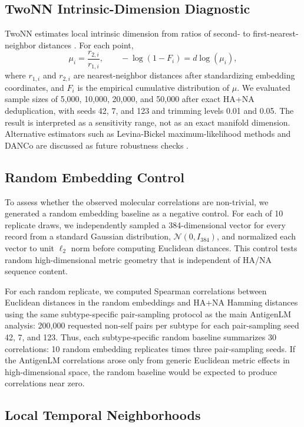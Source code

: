 \documentclass[11pt]{article}
\begin{document}
\subsection{TwoNN Intrinsic-Dimension Diagnostic}

TwoNN estimates local intrinsic dimension from ratios of second- to first-nearest-neighbor distances \cite{facco2017intrinsic}. For each point,
\[
\mu_i=\frac{r_{2,i}}{r_{1,i}},
\qquad
-\log(1-F_i)=d\log(\mu_i),
\]
where $r_{1,i}$ and $r_{2,i}$ are nearest-neighbor distances after standardizing embedding coordinates, and $F_i$ is the empirical cumulative distribution of $\mu$. We evaluated sample sizes of 5,000, 10,000, 20,000, and 50,000 after exact HA+NA deduplication, with seeds 42, 7, and 123 and trimming levels 0.01 and 0.05. The result is interpreted as a sensitivity range, not as an exact manifold dimension. Alternative estimators such as Levina-Bickel maximum-likelihood methods and DANCo are discussed as future robustness checks \cite{levina2005maximum,ceruti2014danco}.

\subsection{Random Embedding Control}

To assess whether the observed molecular correlations are non-trivial, we generated a random embedding baseline as a negative control. For each of 10 replicate draws, we independently sampled a 384-dimensional vector for every record from a standard Gaussian distribution, $\mathcal{N}(0,I_{384})$, and normalized each vector to unit $\ell_2$ norm before computing Euclidean distances. This control tests random high-dimensional metric geometry that is independent of HA/NA sequence content.

For each random replicate, we computed Spearman correlations between Euclidean distances in the random embeddings and HA+NA Hamming distances using the same subtype-specific pair-sampling protocol as the main AntigenLM analysis: 200,000 requested non-self pairs per subtype for each pair-sampling seed 42, 7, and 123. Thus, each subtype-specific random baseline summarizes 30 correlations: 10 random embedding replicates times three pair-sampling seeds. If the AntigenLM correlations arose only from generic Euclidean metric effects in high-dimensional space, the random baseline would be expected to produce correlations near zero.

\subsection{Local Temporal Neighborhoods}
\end{document}
